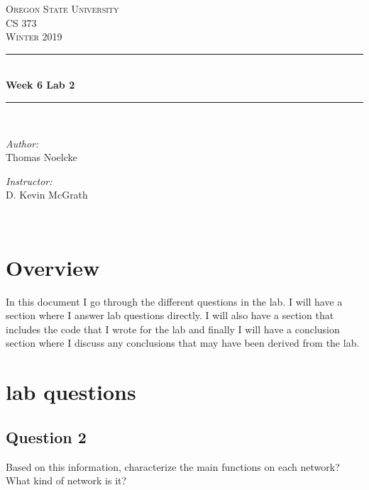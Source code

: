 \documentclass[letterpaper, onecolumn,10pt]{IEEEtran}
\begin{document}
    \begin{titlepage}
    \newcommand{\HRule}{\rule{\linewidth}{0.5mm}}
    \center
    \textsc{\Large Oregon State University}\\[1.5cm]
    \textsc{\Large CS 373}\\[0.5cm]
    \textsc{\Large Winter 2019}\\[0.5cm]
    \HRule \\[0.4cm]
    { \huge \bfseries Week 6 Lab 2}\\[0.4cm] %
    \HRule \\[1.5cm]
    \begin{minipage}{0.4\textwidth}
        \begin{flushleft} \large
        \emph{Author:}\\
        Thomas Noelcke
        \end{flushleft}
    \end{minipage}
    \begin{minipage}{0.4\textwidth}
        \begin{flushright} \large
        \emph{Instructor:} \\
        D. Kevin McGrath\\
        \end{flushright}
    \end{minipage}\\[2cm]
		\end{titlepage}
		
		\section{Overview}
		In this document I go through the different questions in the lab. I will have a section where I answer lab questions directly. I will also have a section that includes the code that I wrote for the lab and finally I will have a conclusion section where I discuss any conclusions that may have been derived from the lab.\\
		
		\section{lab questions}
		    \subsection{Question 2} 
		    Based on this information, characterize the main functions on each network? What kind of network is it?\\
\end{document}
